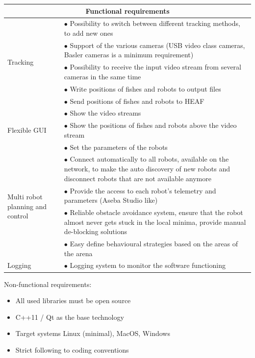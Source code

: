 \documentclass{styles/assisi}
\begin{document}
\begin{table}[h]
\begin{tabular}{|p{}|p{}|}
  \hline
  \multicolumn{2}{|c|}{Functional requirements} \\
  \hline
  \multirow{5}{*}{Tracking} & $\bullet$ Possibility to switch between different tracking methods, to add new ones \\
  & $\bullet$ Support of the various cameras (USB video class cameras, Basler cameras is a minimum requirement) \\
  & $\bullet$ Possibility to receive the input video stream from several cameras in the same time \\
& $\bullet$ Write positions of fishes and robots to output files \\
&  $\bullet$ Send positions of fishes and robots to HEAF \\
\hline
  \multirow{3}{*}{Flexible GUI} & $\bullet$ Show the video streams \\
  & $\bullet$ Show the positions of fishes and robots above the video stream \\
  & $\bullet$ Set the parameters of the robots \\
\hline
  \multirow{4}{*}{\parbox{0.25\textwidth}{Multi robot planning and control}} & $\bullet$ Connect automatically to all robots, available on the network, to make the auto discovery of new robots and disconnect robots that are not available anymore \\
  & $\bullet$ Provide the access to each robot's telemetry and parameters (Aseba Studio like) \\
  & $\bullet$ Reliable obstacle avoidance system, ensure that the robot almost never gets stuck in the local minima, provide manual de-blocking  solutions \\
  & $\bullet$ Easy define behavioural strategies based on the areas of the arena \\
\hline
Logging & $\bullet$ Logging system to monitor the software functioning \\
\hline
\end{tabular}
\end{table}

Non-functional requirements:
\begin{itemize}
\item All used libraries must be open source
\item  C++11 / Qt as the base technology
\item  Target systems Linux (minimal), MacOS, Windows
\item  Strict following to coding conventions
\end{itemize}
\end{document}
